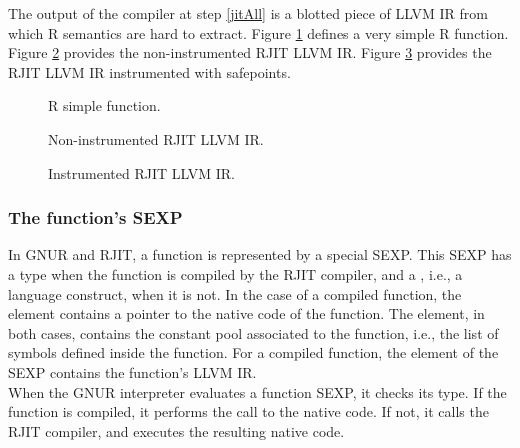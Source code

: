 The output of the compiler at step \ref{jitAll} is a blotted piece of LLVM IR from which R semantics are hard to extract.
Figure \ref{fig:RSimpleFunction} defines a very simple R function.
Figure \ref{fig:noninstrumentedir} provides the non-instrumented RJIT LLVM IR.
Figure \ref{fig:instrumentedir} provides the RJIT LLVM IR instrumented with safepoints.\\

\begin{figure}[h]
        \caption{R simple function.}
        \label{fig:RSimpleFunction}
\end{figure}

\begin{figure}[h]
    \caption{Non-instrumented RJIT LLVM IR.}
    \label{fig:noninstrumentedir}
\end{figure}

\clearpage
\begin{landscape}
\begin{figure}[h]
    \caption{Instrumented RJIT LLVM IR.}
\label{fig:instrumentedir}
\end{figure}
\end{landscape}
\clearpage


\subsubsection{The function's SEXP}
In GNUR and RJIT, a function is represented by a special SEXP. 
This SEXP has a  type when the function is compiled by the RJIT compiler, and a , i.e., a language construct, when it is not.
In the case of a compiled function, the  element contains a pointer to the native code of the function.
The  element, in both cases, contains the constant pool associated to the function, i.e., the list of symbols defined inside the function.
For a compiled function, the  element of the SEXP contains the function's LLVM IR.\\

When the GNUR interpreter evaluates a function SEXP, it checks its type. 
If the function is compiled, it performs the call to the native code. 
If not, it calls the RJIT compiler, and executes the resulting native code.\\


